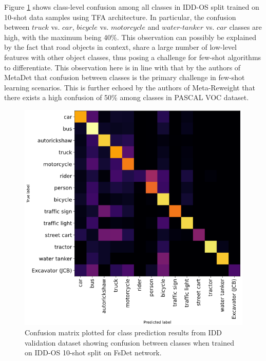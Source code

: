 \documentclass[letterpaper]{article} %
\begin{document}
Figure \ref{confmatrix} shows class-level confusion among all classes in IDD-OS split trained on 10-shot data samples using TFA architecture. In particular, the confusion between $truck$ vs. $car$, $bicycle$ vs. $motorcycle$ and $water$-$tanker$ vs. $car$ classes are high, with the maximum being 40\%. This observation can possibly be explained by the fact that road objects in context, share a large number of low-level features with other object classes, thus posing a challenge for few-shot algorithms to differentiate. This observation here is in line with that by the authors of MetaDet \cite{metadet} that confusion between classes is the primary challenge in few-shot learning scenarios. This is further echoed by the authors of Meta-Reweight \cite{reweight} that there exists a high confusion of 50\% among classes in PASCAL VOC dataset.

\begin{figure}[t]
      \centering
      \includegraphics[width=0.95\columnwidth]{confusion_matrix}
      \caption{Confusion matrix plotted for class prediction results from IDD validation dataset showing confusion between classes when trained on IDD-OS 10-shot split on FsDet network.}
      \label{confmatrix}
\end{figure}
\end{document}
